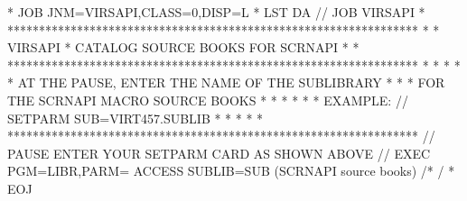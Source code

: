 \documentclass[letterpaper,10pt,english]{sphinxmanual}
\begin{document}

\begin{sphinxVerbatim}[commandchars=\\\{\}]
* \PYGZdl{}\PYGZdl{} JOB JNM=VIRSAPI,CLASS=0,DISP=L
* \PYGZdl{}\PYGZdl{} LST DA
// JOB VIRSAPI
* *****************************************************************
* * VIRSAPI * CATALOG SOURCE BOOKS FOR SCRNAPI                    *
* *****************************************************************
* *                                                               *
* * AT THE PAUSE, ENTER THE NAME OF THE SUB\PYGZhy{}LIBRARY               *
* * FOR THE SCRNAPI MACRO SOURCE BOOKS                            *
* *                                                               *
* * EXAMPLE: // SETPARM SUB=\PYGZsq{}VIRT457.SUBLIB\PYGZsq{}                      *
* *                                                               *
* *****************************************************************
// PAUSE ENTER YOUR SETPARM CARD AS SHOWN ABOVE
// EXEC PGM=LIBR,PARM=\PYGZsq{} ACCESS SUBLIB=\PYGZam{}SUB\PYGZsq{}
        (SCRNAPI source books)
/*
/\PYGZam{}
* \PYGZdl{}\PYGZdl{} EOJ
\end{sphinxVerbatim}

\end{document}

